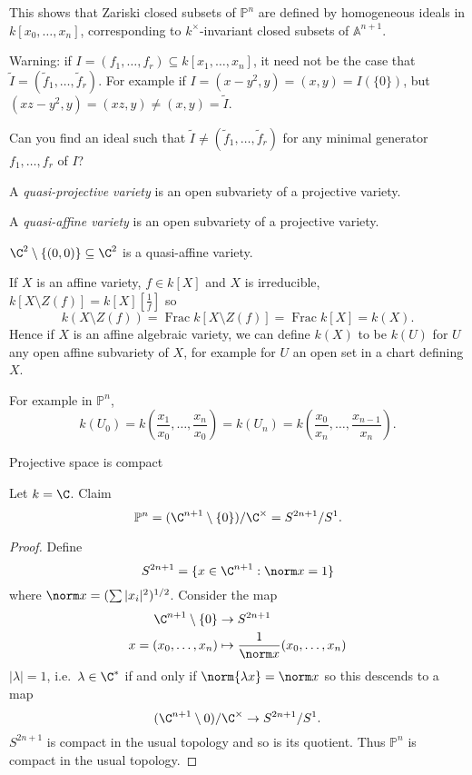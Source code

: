 \documentclass[a4paper]{article}
\renewcommand{\A}{\mathbb{A}}
\renewcommand*{\P}{\mathbb{P}}
\begin{document}
This shows that Zariski closed subsets of \(\P^n\) are defined by homogeneous ideals in \(k[x_0, \dots, x_n]\), corresponding to \(k^\times\)-invariant closed subsets of \(\A^{n + 1}\).

Warning: if \(I = (f_1, \dots, f_r) \subseteq k[x_1, \dots, x_n]\), it need not be the case that \(\tilde I = (\tilde f_1, \dots, \tilde f_r)\). For example if \(I = (x - y^2, y) = (x, y) = I(\{0\})\), but \((xz - y^2, y) = (xz, y) \neq (x, y) = \tilde I\).

\begin{ex}
  Can you find an ideal such that \(\tilde I \neq (\tilde f_1, \dots, \tilde f_r)\) for any minimal generator \(f_1, \dots, f_r\) of \(I\)?
\end{ex}

\begin{definition}
  A \emph{quasi-projective variety} is an open subvariety of a projective variety.

  A \emph{quasi-affine variety} is an open subvariety of a projective variety.
\end{definition}

\begin{eg}
  \(\C^2 \setminus \{(0, 0)\} \subseteq \C^2\) is a quasi-affine variety.
\end{eg}

\begin{remark}
  If \(X\) is an affine variety, \(f \in k[X]\) and \(X\) is irreducible, \(k[X \setminus Z(f)] = k[X][\frac{1}{f}]\) so
  \[
    k(X \setminus Z(f)) = \operatorname{Frac} k[X \setminus Z(f)] = \operatorname{Frac} k[X] = k(X).
  \]
  Hence if \(X\) is an affine algebraic variety, we can define \(k(X)\) to be \(k(U)\) for \(U\) any open affine subvariety of \(X\), for example for \(U\) an open set in a chart defining \(X\).

  For example in \(\P^n\),
  \[
    k(U_0)
    = k(\frac{x_1}{x_0}, \dots, \frac{x_n}{x_0})
    = k(U_n)
    = k(\frac{x_0}{x_n}, \dots, \frac{x_{n - 1}}{x_n}).
  \]
\end{remark}

Projective space is compact

Let \(k = \C\). Claim
\[
  \P^n = (\C^{n + 1} \setminus \{0\}) / \C^\times = S^{2n + 1}/S^1.
\]

\begin{proof}
  Define
  \[
    S^{2n + 1} = \{x \in \C^{n + 1}: \norm x = 1\}
  \]
  where \(\norm x = (\sum |x_i|^2)^{1/2}\). Consider the map
  \begin{align*}
    \C^{n + 1} \setminus \{0\} &\to S^{2n + 1} \\
    x = (x_0, \dots, x_n) &\mapsto \frac{1}{\norm x} (x_0, \dots, x_n)
  \end{align*}
  \(|\lambda| = 1\), i.e.\ \(\lambda \in \C^*\) if and only if \(\norm{\lambda x} = \norm x\) so this descends to a map
  \[
    (\C^{n + 1} \setminus 0)/ \C^\times \to S^{2n + 1}/S^1.
  \]
  \(S^{2n + 1}\) is compact in the usual topology and so is its quotient. Thus \(\P^n\) is compact in the usual topology.
\end{proof}
\end{document}
